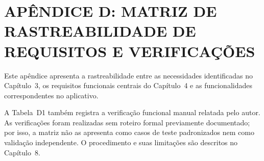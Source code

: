\clearpage

\section*{APÊNDICE D: MATRIZ DE RASTREABILIDADE DE REQUISITOS E VERIFICAÇÕES}

Este apêndice apresenta a rastreabilidade entre as necessidades identificadas no Capítulo~3, os requisitos funcionais centrais do Capítulo~4 e as funcionalidades correspondentes no aplicativo.

A Tabela~D1 também registra a verificação funcional manual relatada pelo autor. As verificações foram realizadas sem roteiro formal previamente documentado; por isso, a matriz não as apresenta como casos de teste padronizados nem como validação independente. O procedimento e suas limitações são descritos no Capítulo~8.

